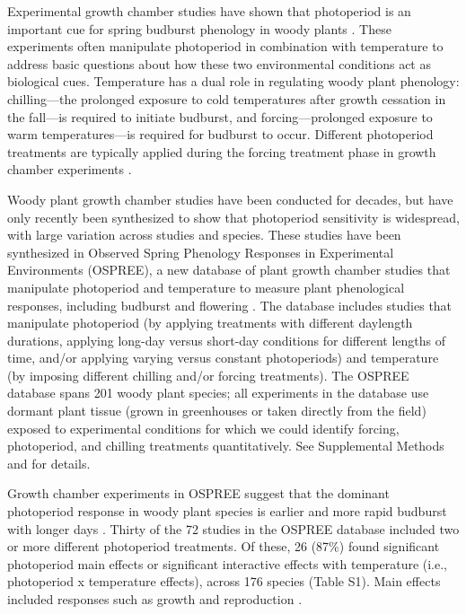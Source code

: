 \documentclass{article}
\begin{document}
\par Experimental growth chamber studies have shown that photoperiod is an important cue for spring budburst phenology in woody plants \citep[e.g.,][]{flynn2018,Basler:2014aa,Heide:1993a}. These experiments often manipulate photoperiod in combination with temperature to address basic questions about how these two environmental conditions act as biological cues. Temperature has a dual role in regulating woody plant phenology: chilling---the prolonged exposure to cold temperatures after growth cessation in the fall---is required to initiate budburst, and forcing---prolonged exposure to warm temperatures---is required for budburst to occur. Different photoperiod treatments are typically applied during the forcing treatment phase in growth chamber experiments \citep[e.g.,][]{Laube:2014a,Spann:2004aa,Falusi:1990aa,HEIDE:1977aa,Campbell:1975aa}. 

\par Woody plant growth chamber studies have been conducted for decades, but have only recently been synthesized to show that photoperiod sensitivity is widespread, with large variation across studies and species. These studies have been synthesized in Observed Spring Phenology Responses in Experimental Environments (OSPREE), a new database of plant growth chamber studies that manipulate photoperiod and temperature to measure plant phenological responses, including budburst and flowering \citep{wolkovich2019}. The database includes studies that manipulate photoperiod (by applying treatments with different daylength durations, applying long-day versus short-day conditions for different lengths of time, and/or applying varying versus constant photoperiods) and temperature (by imposing different chilling and/or forcing treatments). The OSPREE database spans 201 woody plant species; all experiments in the database use dormant plant tissue (grown in greenhouses or taken directly from the field) exposed to experimental conditions for which we could identify forcing, photoperiod, and chilling treatments quantitatively. See Supplemental Methods and \citet{wolkovich2019} for details. 


\par Growth chamber experiments in OSPREE suggest that the dominant photoperiod response in woody plant species is earlier and more rapid budburst with longer days \citep [e.g., ][]{Caffarra:2011a}. Thirty of the 72 studies in the OSPREE database included two or more different photoperiod treatments. Of these, 26 (87\%) found significant photoperiod main effects or significant interactive effects with temperature (i.e., photoperiod x temperature effects), across 176 species (Table S1). Main effects included responses such as growth \citep[e.g., higher growth rates with longer days][]{Ashby:1962aa} and reproduction \citep[e.g., increased flowering with longer days][]{Heide:2012aa}. 
\end{document}
